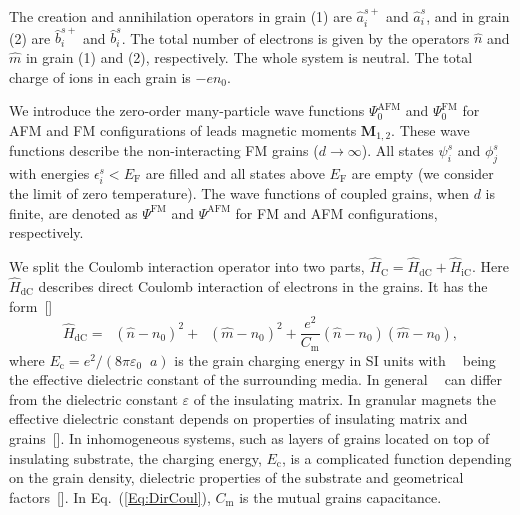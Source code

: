 \documentclass[aps,prb,amsmath,amssymb,twocolumn,superscriptaddress,showpacs,floatfix]{revtex4-1}
\DeclareMathOperator{\Ec}{\mathit E_{\mathrm c}}
\DeclareMathOperator{\epseff}{\varepsilon_\mathrm{eff}}
\begin{document}
The creation and annihilation operators in grain (1) are
$\hat a^{s+}_i$ and $\hat a^{s}_i$, and in grain (2) are
$\hat b^{s+}_i$ and $\hat b^{s}_i$. The total number of electrons is given
by the operators $\hat n$ and $\hat m$ in grain (1) and (2), respectively.
The whole system is neutral. The total charge of ions in each grain is $-en_0$.

We introduce the zero-order many-particle wave
functions $\Psi^\mathrm{AFM}_0$ and $\Psi^\mathrm{FM}_0$ for
AFM and FM configurations of leads magnetic moments $\mathbf{M}_{1,2}$.
These wave functions describe the non-interacting FM grains ($d\to\infty$).
All states $\psi^s_i$ and $\phi^s_j$ with
energies $\epsilon^s_i<E_\mathrm F$ are filled and all states above $E_\mathrm F$ are empty (we consider the limit of zero temperature). The wave functions of coupled grains, when $d$ is finite,
are denoted as $\Psi^\mathrm{FM}$ and $\Psi^\mathrm{AFM}$ for FM and AFM configurations,
respectively.

We split the Coulomb interaction operator into two parts,
$\hat H_\mathrm C=\hat H_\mathrm{dC}+\hat H_\mathrm{iC}$.
Here $\hat H_\mathrm{dC}$ describes direct Coulomb interaction of electrons in the grains.
It has the form~[]
\begin{equation}\label{Eq:DirCoul}
\hat H_\mathrm{dC}=\Ec (\hat n-n_0)^2+\Ec (\hat m-n_0)^2+\frac{e^2}{C_\mathrm m}(\hat n-n_0)(\hat m-n_0),
\end{equation}
where $E_\mathrm c=e^2/(8\pi\varepsilon_0\epseff a)$ is the grain charging energy in SI units with $\epseff$ being the effective dielectric constant of the surrounding media. In general $\epseff$ can differ from the dielectric constant $\varepsilon$ of the insulating matrix.
In granular magnets the effective dielectric constant depends on properties of insulating matrix and grains~[]. In inhomogeneous systems, such as
layers of grains located on top of insulating  substrate, the charging energy,
$E_\mathrm c$, is a complicated function depending on the grain density, dielectric properties of
the substrate and geometrical factors~[]. In Eq.~(\ref{Eq:DirCoul}),
$C_\mathrm m$ is the mutual grains capacitance.
\end{document}
